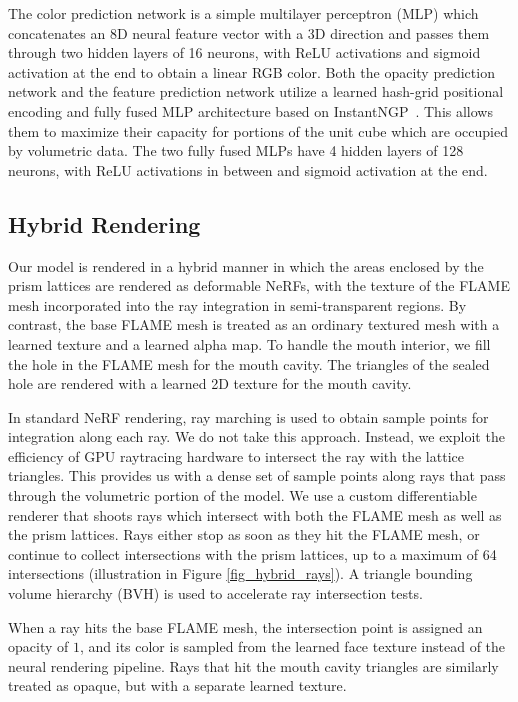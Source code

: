 The color prediction network is a simple multilayer perceptron (MLP) which concatenates an 8D neural feature vector with a 3D direction and passes them through two hidden layers of 16 neurons, with ReLU activations and sigmoid activation at the end to obtain a linear RGB color. Both the opacity prediction network and the feature prediction network utilize a learned hash-grid positional encoding and fully fused MLP architecture based on InstantNGP~\cite{muller2022instantngp}. This allows them to maximize their capacity for portions of the unit cube which are occupied by volumetric data. The two fully fused MLPs have 4 hidden layers of 128 neurons, with ReLU activations in between and sigmoid activation at the end.

\subsection{Hybrid Rendering}
\label{subsec_model_rendering}

Our model is rendered in a hybrid manner in which the areas enclosed by the prism lattices are rendered as deformable NeRFs, with the texture of the FLAME mesh incorporated into the ray integration in semi-transparent regions. By contrast, the base FLAME mesh is treated as an ordinary textured mesh with a learned texture and a learned alpha map. To handle the mouth interior, we fill the hole in the FLAME mesh for the mouth cavity. The triangles of the sealed hole are rendered with a learned 2D texture for the mouth cavity.

In standard NeRF rendering, ray marching is used to obtain sample points for integration along each ray. We do not take this approach. Instead, we exploit the efficiency of GPU raytracing hardware to intersect the ray with the lattice triangles. This provides us with a dense set of sample points along rays that pass through the volumetric portion of the model.
We use a custom differentiable renderer that shoots rays which intersect with both the FLAME mesh as well as the prism lattices. Rays either stop as soon as they hit the FLAME mesh, or continue to collect intersections with the prism lattices, up to a maximum of 64 intersections (illustration in Figure \ref{fig_hybrid_rays}). A triangle bounding volume hierarchy (BVH) is used to accelerate ray intersection tests. 


When a ray hits the base FLAME mesh, the intersection point is assigned an opacity of $1$, and its color is sampled from the learned face texture instead of the neural rendering pipeline. Rays that hit the mouth cavity triangles are similarly treated as opaque, but with a separate learned texture.

